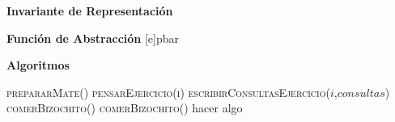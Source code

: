 \textbf{Invariante de Representación}

\par\vspace*{3ex}%

\textbf{Función de Abstracción}
[e]{p}{bar}

\textbf{Algoritmos}
\begin{algorithm}[H]
  \begin{algorithmic}[1]
    \State{} 
    \State{} 
    \State{}
    \State\textsc{prepararMate()} 
    \State\textsc{pensarEjercicio(i)}
      \State\textsc{escribirConsultasEjercicio($i$,$consultas$)}
    \Else
      \State\textsc{comerBizochito()}
    \EndIf
      \State\textsc{comerBizochito()}
    \EndWhile
         \State hacer algo
    \EndFor
    \State{}
  \end{algorithmic}
\end{algorithm}

